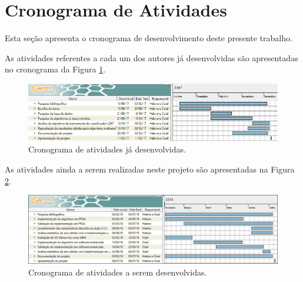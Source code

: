 \section{Cronograma de Atividades}
Esta seção apresenta o cronograma de desenvolvimento deste presente trabalho.

As atividades referentes a cada um dos autores já desenvolvidas são apresentadas no cronograma da Figura \ref{cronograma}.

\begin{figure}[h]
	\centering
	\includegraphics[keepaspectratio=true,scale=0.6]{figuras/cronograma.PNG}
	\caption{Cronograma de atividades já desenvolvidas.}
	\label{cronograma}
\end{figure}


As atividades ainda a serem realizadas neste projeto são apresentadas na Figura \ref{cronograma2}.

\begin{figure}[h]
	\centering
	\includegraphics[keepaspectratio=true,scale=0.55]{figuras/cronograma2.PNG}
	\caption{Cronograma de atividades a serem desenvolvidas.}
	\label{cronograma2}
\end{figure}

